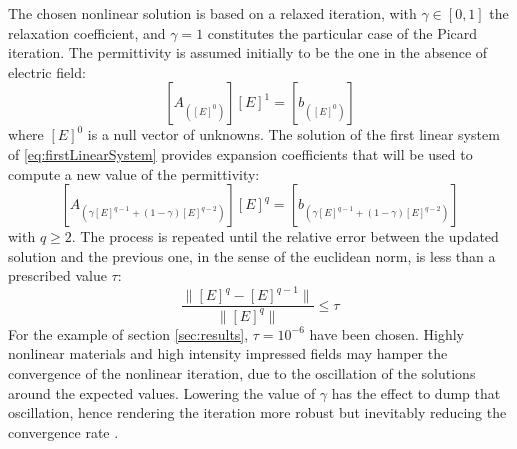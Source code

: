 \documentclass[journal]{IEEEtran}
\begin{document}
The chosen nonlinear solution is based on a relaxed iteration, with $\gamma \in [0,1]$ the relaxation coefficient, and $\gamma = 1$ constitutes the particular case of the Picard iteration. The permittivity is assumed initially to be the one in the absence of electric field: 
\begin{equation} \label{eq:firstLinearSystem}
[A_{([E]^0)}] [E]^1 = [b_{([E]^0)}]
\end{equation} where $[E]^0$ is a null vector of unknowns. The solution of the first linear system of \eqref{eq:firstLinearSystem} provides expansion coefficients that will be used to compute a new value of the permittivity:
\begin{equation} \label{eq:lastLinearSystem}
[A_{(\gamma [E]^{q-1} + (1-\gamma) [E]^{q-2})}] [E]^{q} = [b_{(\gamma [E]^{q-1} + (1-\gamma) [E]^{q-2})}]
\end{equation}
with $q \geq 2$. The process is repeated until the relative error between the updated solution and the previous one, in the sense of the euclidean norm, is less than a prescribed value $\tau$:
\begin{equation}
\frac{\|[E]^{q} - [E]^{q-1} \|}{\| [E]^{q} \|} \leq \tau
\end{equation}
For the example of section \ref{sec:results}, $\tau = 10^{-6}$ have been chosen. Highly nonlinear materials and high intensity impressed fields may hamper the convergence of the nonlinear iteration, due to the oscillation of the solutions around the expected values. Lowering the value of $\gamma$ has the effect to dump that oscillation, hence rendering the iteration more robust but inevitably reducing the convergence rate %
\cite{Silvester1997}.
\end{document}
